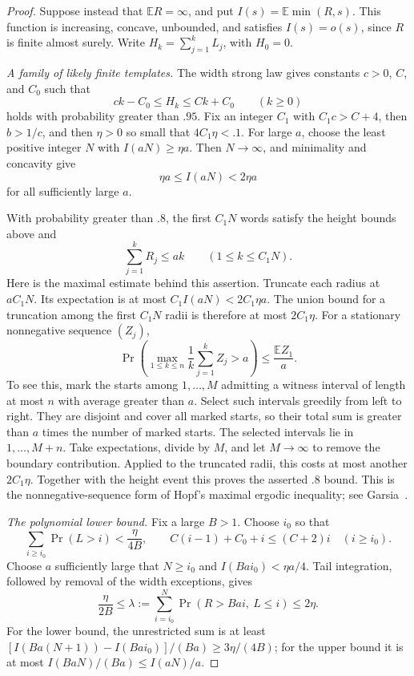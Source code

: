 \begin{proof}
Suppose instead that $\mathbb E R=\infty$, and put
$I(s)=\mathbb E\min(R,s)$. This function is increasing, concave,
unbounded, and satisfies $I(s)=o(s)$, since $R$ is finite almost surely.
Write $H_k=\sum_{j=1}^kL_j$, with $H_0=0$.

\smallskip\noindent\emph{A family of likely finite templates.}
The width strong law gives constants $c>0$, $C$, and $C_0$ such that
\[
ck-C_0\le H_k\le Ck+C_0\qquad(k\ge0)
\]
holds with probability greater than $.95$. Fix an integer $C_1$ with
$C_1c>C+4$, then $b>1/c$, and then $\eta>0$ so small that
$4C_1\eta<.1$. For large $a$, choose the least positive integer $N$
with $I(aN)\ge\eta a$. Then $N\to\infty$, and minimality and
concavity give
\[
\eta a\le I(aN)<2\eta a
\]
for all sufficiently large $a$.

With probability greater than $.8$, the first $C_1N$ words satisfy the
height bounds above and
\[
\sum_{j=1}^kR_j\le ak\qquad(1\le k\le C_1N).
\tag{2}\label{eq:2}
\]
Here is the maximal estimate behind this assertion. Truncate each
radius at $aC_1N$. Its expectation is at most
$C_1I(aN)<2C_1\eta a$. The union bound for a truncation among the
first $C_1N$ radii is therefore at most $2C_1\eta$. For a stationary
nonnegative sequence $(Z_j)$,
\[
\Pr\!\left(\max_{1\le k\le n}\frac1k\sum_{j=1}^kZ_j>a\right)
\le \frac{\mathbb E Z_1}{a}.
\]
To see this, mark the starts among $1,\ldots,M$ admitting a witness
interval of length at most $n$ with average greater than $a$. Select
such intervals greedily from left to right. They are disjoint and cover
all marked starts, so their total sum is greater than $a$ times the
number of marked starts. The selected intervals lie in $1,\ldots,M+n$.
Take expectations, divide by $M$, and let $M\to\infty$ to remove
the boundary contribution.
Applied to the truncated radii, this costs at most another
$2C_1\eta$. Together with the height event this proves the asserted
$.8$ bound. This is the nonnegative-sequence form of Hopf's maximal
ergodic inequality; see Garsia~\cite{Garsia1965}.

\smallskip\noindent\emph{The polynomial lower bound.}
Fix a large $B>1$. Choose $i_0$ so that
\[
\sum_{i\ge i_0}\Pr(L>i)<\frac{\eta}{4B},\qquad
C(i-1)+C_0+i\le(C+2)i\quad(i\ge i_0).
\]
Choose $a$ sufficiently large that $N\ge i_0$ and
$I(Bai_0)<\eta a/4$. Tail integration, followed by removal of the
width exceptions, gives
\[
\frac{\eta}{2B}\le
\lambda:=\sum_{i=i_0}^N\Pr(R>Bai,\ L\le i)
\le2\eta.
\]
For the lower bound, the unrestricted sum is at least
$[I(Ba(N+1))-I(Bai_0)]/(Ba)\ge3\eta/(4B)$; for the upper bound it
is at most $I(BaN)/(Ba)\le I(aN)/a$.


\end{proof}
